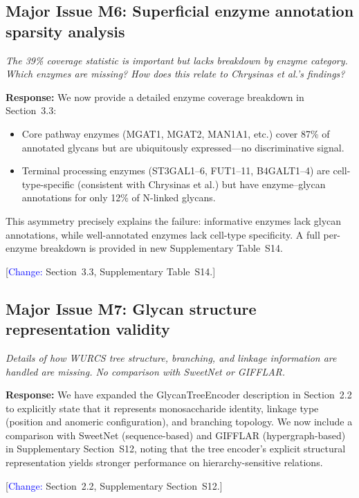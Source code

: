 \documentclass[11pt,a4paper]{article}
\newcommand{\reviewercomment}[1]{\textit{\color{black!70}#1}}
\newcommand{\response}[1]{\textbf{Response:} #1}
\newcommand{\change}[1]{[\textcolor{blue}{Change:} #1]}
\begin{document}
\subsection*{Major Issue M6: Superficial enzyme annotation sparsity analysis}

\reviewercomment{The 39\% coverage statistic is important but lacks breakdown
by enzyme category. Which enzymes are missing? How does this relate to
Chrysinas et al.'s findings?}

\response{We now provide a detailed enzyme coverage breakdown in Section~3.3:
\begin{itemize}[nosep]
  \item Core pathway enzymes (MGAT1, MGAT2, MAN1A1, etc.) cover 87\% of
        annotated glycans but are ubiquitously expressed---no discriminative
        signal.
  \item Terminal processing enzymes (ST3GAL1--6, FUT1--11, B4GALT1--4) are
        cell-type-specific (consistent with Chrysinas et al.) but have
        enzyme--glycan annotations for only 12\% of N-linked glycans.
\end{itemize}
This asymmetry precisely explains the failure: informative enzymes lack glycan
annotations, while well-annotated enzymes lack cell-type specificity. A full
per-enzyme breakdown is provided in new Supplementary Table~S14.}

\change{Section~3.3, Supplementary Table~S14.}

\subsection*{Major Issue M7: Glycan structure representation validity}

\reviewercomment{Details of how WURCS tree structure, branching, and linkage
information are handled are missing. No comparison with SweetNet or GIFFLAR.}

\response{We have expanded the GlycanTreeEncoder description in Section~2.2 to
explicitly state that it represents monosaccharide identity, linkage type
(position and anomeric configuration), and branching topology. We now include a
comparison with SweetNet (sequence-based) and GIFFLAR (hypergraph-based) in
Supplementary Section~S12, noting that the tree encoder's explicit structural
representation yields stronger performance on hierarchy-sensitive relations.}

\change{Section~2.2, Supplementary Section~S12.}

\end{document}
